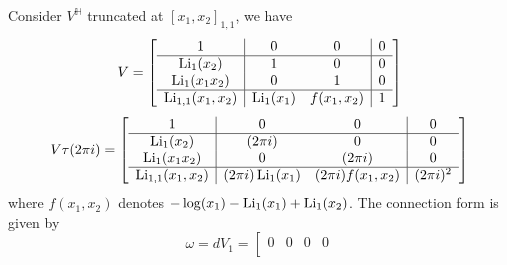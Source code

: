 \begin{example}
Consider $V^{\mathbb H}$ truncated at $[x_1,x_2]_{1,1}$, we have
\[
V=\left[
\begin{array}{c|cc|c}
1&0&0&0\\
\hline
\operatorname{Li}_1(x_2)&1&0&0\\
\operatorname{Li}_1(x_1x_2)&0&1&0\\
\hline
\operatorname{Li}_{1,1}(x_1,x_2)&\operatorname{Li}_1(x_1)&f(x_1,x_2)&1
\end{array}
\right]
\]
\[
V\tau(2\pi i)=\left[
\begin{array}{c|cc|c}
1&0&0&0\\
\hline
\operatorname{Li}_1(x_2)&(2\pi i)&0&0\\
\operatorname{Li}_1(x_1x_2)&0&(2\pi i)&0\\
\hline
\operatorname{Li}_{1,1}(x_1,x_2)&(2\pi i)\operatorname{Li}_1(x_1)&(2\pi i)f(x_1,x_2)&(2\pi i)^2
\end{array}
\right]
\]
where $f(x_1,x_2)$ denotes $-\log(x_1)-\operatorname{Li}_1(x_1)+\operatorname{Li}_1(x_2)$. The connection form is given by
\[
\omega=dV_1=\left[
\begin{array}{c|cc|c}
0&0&0&0\\

\end{array}\]
\end{example}
